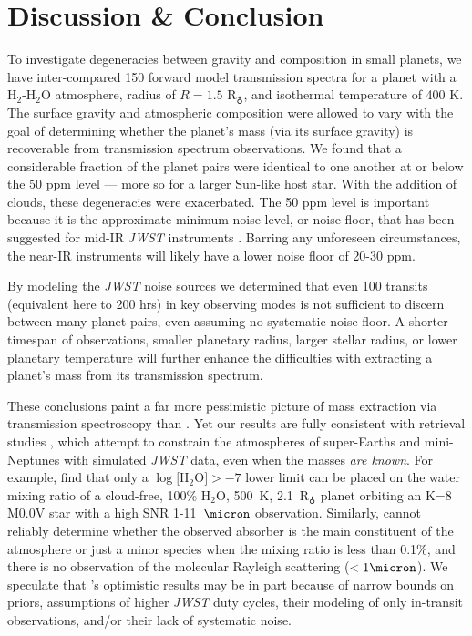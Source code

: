\documentclass[iop]{emulateapj}
\begin{document}
\section{Discussion \& Conclusion}

To investigate degeneracies between gravity and composition in small planets, we have inter-compared 150 forward model transmission spectra for a planet with a H$_2$-H$_2$O atmosphere, radius of $R=1.5$ R$_\earth$, and isothermal temperature of 400 K. The surface gravity and atmospheric composition were allowed to vary with the goal of determining whether the planet's mass (via its surface gravity) is recoverable from transmission spectrum observations.  We found that a considerable fraction of the planet pairs were identical to one another at or below the 50 ppm level --- more so for a larger Sun-like host star.  With the addition of clouds, these degeneracies were exacerbated.  The 50 ppm level is important because it is the approximate minimum noise level, or noise floor, that has been suggested for mid-IR \emph{JWST} instruments \citep{gre16}. Barring any unforeseen circumstances, the near-IR instruments will likely have a lower noise floor of 20-30 ppm. 

By modeling the \emph{JWST} noise sources we determined that even 100 transits (equivalent here to 200 hrs) in key observing modes is not sufficient to discern between many planet pairs, even assuming no systematic noise floor. A shorter timespan of observations, smaller planetary radius, larger stellar radius, or lower planetary temperature will further enhance the difficulties with extracting a planet's mass from its transmission spectrum.

These conclusions paint a far more pessimistic picture of mass extraction via transmission spectroscopy than \citet{dew13}. Yet our results are fully consistent with retrieval studies \citep{ben12,ben13,bar15,gre16}, which attempt to constrain the atmospheres of super-Earths and mini-Neptunes with simulated \emph{JWST} data, even when the masses \emph{are known}. For example, \citet{gre16} find that only a $\log[$H$_2$O$]>-7$ lower limit can be placed on the water mixing ratio of a cloud-free, 100\% H$_2$O, 500~K, 2.1~R$_\earth$ planet orbiting an K=8 M0.0V star with a high SNR 1-11~$\micron$ observation. Similarly, \citet{ben12} cannot reliably determine whether the observed absorber is the main constituent of the atmosphere or just a minor species when the mixing ratio is less than 0.1\%, and there is no observation of the molecular Rayleigh scattering ($<1 \micron$). We speculate that \citet{dew13}'s optimistic results may be in part because of narrow bounds on priors, assumptions of higher \emph{JWST} duty cycles, their modeling of only in-transit observations, and/or their lack of systematic noise. 
\end{document}
